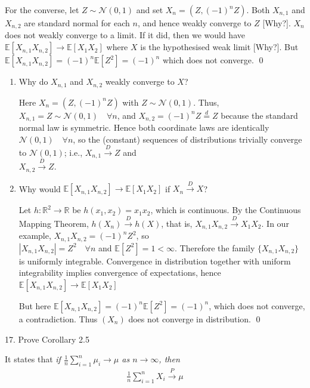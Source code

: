 \documentclass[10pt]{article}
\begin{document}
For the converse, let $Z \sim \mathcal{N}(0, 1)$ and set $X_n = (Z, (-1)^nZ)$. Both $X_{n, 1}$ and $X_{n, 2}$ are standard normal for each $n$, and hence weakly converge to $Z$ [Why?]. $X_n$ does not weakly converge to a limit. If it did, then we would have $\mathbb{E}[X_{n, 1}X_{n, 2}] \to \mathbb{E}[X_1X_2]$ where $X $ is the hypothesised weak limit [Why?]. But $\mathbb{E}[X_{n, 1}X_{n, 2}] = (-1)^n \mathbb{E}[Z^2] = (-1)^n $ which does not converge. \qed

\begin{enumerate}
    \item Why do $X_{n, 1}$ and $X_{n, 2}$ weakly converge to $X $?
    
    Here $X_n = (Z, (-1)^nZ)$ with $Z \sim \mathcal{N}(0, 1)$. Thus, $X_{n, 1} = Z \sim \mathcal{N}(0, 1)\quad\forall n $, and $X_{n, 2} = (-1)^nZ \stackrel{d}{=} Z $ because the standard normal law is symmetric. Hence both coordinate laws are identically $\mathcal{N}(0, 1)\quad\forall n $, so the (constant) sequences of distributions trivially converge to $\mathcal{N}(0, 1)$; i.e., $X_{n, 1}\xrightarrow{D}Z $ and \\$X_{n, 2} \xrightarrow{D}Z$.
    \item Why would $\mathbb{E}[X_{n, 1}X_{n, 2}] \to \mathbb{E}[X_1X_2]$ if $X_n \xrightarrow{D} X $?
    
    Let $h : \mathbb{R}^2 \to \mathbb{R}$ be $h(x_1, x_2) = x_1x_2 $, which is continuous. By the Continuous Mapping Theorem, $h(X_n) \xrightarrow{D} h(X)$, that is, $X_{n, 1}X_{n, 2} \xrightarrow{D} X_1X_2 $. In our example, $X_{n, 1}X_{n, 2} = (-1)^nZ^2 $, so \\$|X_{n, 1}X_{n, 2}| = Z^2 \quad\forall n $ and $\mathbb{E}[Z^2] = 1 < \infty $. Therefore the family $\{X_{n, 1}X_{n, 2}\}$ is uniformly integrable. Convergence in distribution together with uniform integrability implies convergence of expectations, hence $\mathbb{E}[X_{n, 1}X_{n, 2}] \to \mathbb{E}[X_1X_2]$

    But here $\mathbb{E}[X_{n, 1}X_{n, 2}] = (-1)^n \mathbb{E}[Z^2] = (-1)^n $, which does not converge, a contradiction. Thus $(X_n)$ does not converge in distribution. \qed
\end{enumerate}

\newpage

17. Prove Corollary 2.5

It states that \textit{if $\frac{1}{n}\sum_{i = 1}^{n}\mu_i\to\mu $ as $n\to \infty $, then }
\begin{gather*}
    \frac{1}{n}\sum_{i = 1}^{n}X_i \xrightarrow{P}\mu
\end{gather*}
\end{document}
